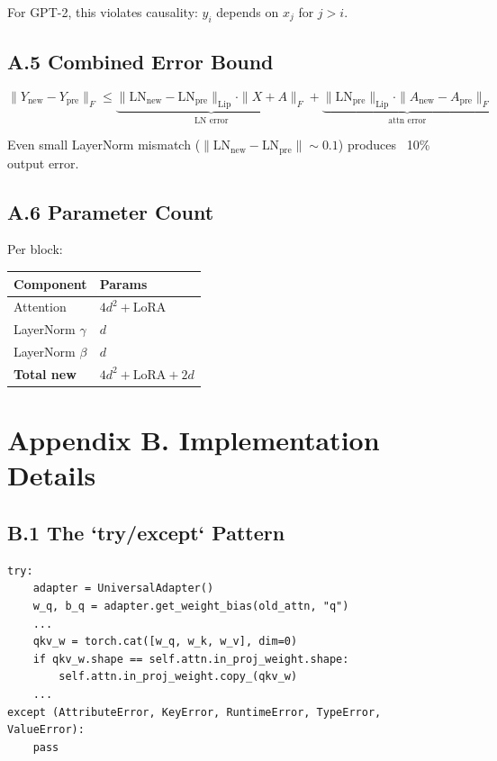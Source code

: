 For GPT-2, this violates causality: $y_i$ depends on $x_j$ for $j > i$.

\subsection{A.5 Combined Error Bound}

\[
\|Y_\text{new} - Y_\text{pre}\|_F \leq \underbrace{\|\text{LN}_\text{new} - \text{LN}_\text{pre}\|_\text{Lip} \cdot \|X + A\|_F}_{\text{LN error}} + \underbrace{\|\text{LN}_\text{pre}\|_\text{Lip} \cdot \|A_\text{new} - A_\text{pre}\|_F}_{\text{attn error}}
\tag{A.7}
\]

Even small LayerNorm mismatch ($\|\text{LN}_\text{new} - \text{LN}_\text{pre}\| \sim 0.1$) 
produces ~10\% output error.

\subsection{A.6 Parameter Count}

Per block:

\begin{table}[H]
\centering
\small
\begin{tabular}{ll}
\toprule
\textbf{Component} & \textbf{Params} \\
\midrule
Attention & $4 d^2 + \text{LoRA}$ \\
LayerNorm $\gamma$ & $d$ \\
LayerNorm $\beta$ & $d$ \\
\textbf{Total new} & $4 d^2 + \text{LoRA} + 2d$ \\
\bottomrule
\end{tabular}
\end{table}




\section{Appendix B. Implementation Details}

\subsection{B.1 The `try/except` Pattern}

\begin{lstlisting}
try:
    adapter = UniversalAdapter()
    w_q, b_q = adapter.get_weight_bias(old_attn, "q")
    ...
    qkv_w = torch.cat([w_q, w_k, w_v], dim=0)
    if qkv_w.shape == self.attn.in_proj_weight.shape:
        self.attn.in_proj_weight.copy_(qkv_w)
    ...
except (AttributeError, KeyError, RuntimeError, TypeError, ValueError):
    pass
\end{lstlisting}

